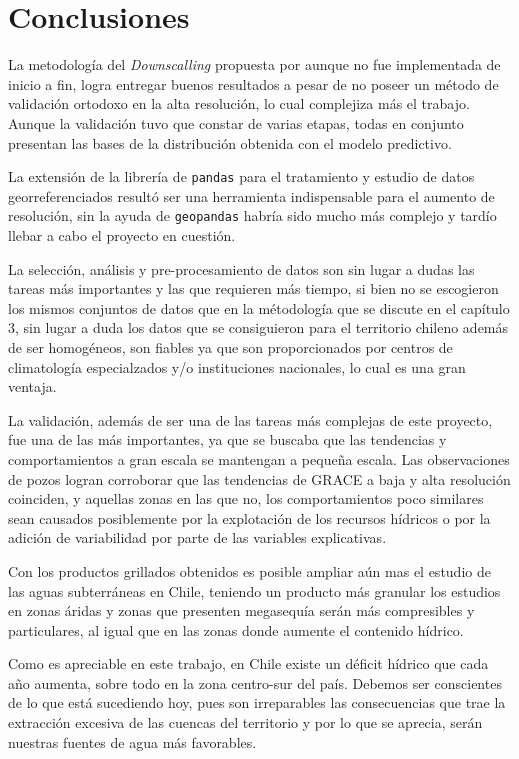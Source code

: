 \chapter{Conclusiones}
\label{C6}

La metodología del \textit{Downscalling} propuesta por \cite{11} aunque no fue implementada de inicio a fin, logra entregar buenos resultados a pesar de no poseer un método de validación ortodoxo en la alta resolución, lo cual
complejiza más el trabajo. Aunque la validación tuvo que constar de varias etapas, todas en conjunto presentan las bases de la distribución obtenida con el modelo predictivo.

La extensión de la librería de \texttt{pandas} para el tratamiento y estudio de datos georreferenciados resultó ser una herramienta indispensable para el aumento de resolución, sin la ayuda de \texttt{geopandas} habría sido
mucho más complejo y tardío llebar a cabo el proyecto en cuestión.

La selección, análisis y pre-procesamiento de datos son sin lugar a dudas las tareas más importantes y las que requieren más tiempo, si bien no se escogieron los mismos conjuntos de datos que en la métodología que se discute 
en el capítulo 3, sin lugar a duda los datos que se consiguieron para el territorio chileno además de ser homogéneos, son fiables ya que son proporcionados por centros de climatología especialzados y/o instituciones nacionales, lo cual
es una gran ventaja.

La validación, además de ser una de las tareas más complejas de este proyecto, fue una de las más importantes, ya que se buscaba que las tendencias y comportamientos a gran escala se mantengan a pequeña escala. Las observaciones de pozos
logran corroborar que las tendencias de GRACE a baja y alta resolución coinciden, y aquellas zonas en las que no, los comportamientos poco similares sean causados posiblemente por la explotación de los recursos hídricos o por la adición de variabilidad por parte de las
variables explicativas.

Con los productos grillados obtenidos es posible ampliar aún mas el estudio de las aguas subterráneas en Chile, teniendo un producto más granular los estudios en zonas áridas y zonas que presenten megasequía serán 
más compresibles y particulares, al igual que en las zonas donde aumente el contenido hídrico.

Como es apreciable en este trabajo, en Chile existe un déficit hídrico que cada año aumenta, sobre todo en la zona centro-sur del país. Debemos ser conscientes de lo que está sucediendo hoy, pues son irreparables las consecuencias que trae
la extracción excesiva de las cuencas del territorio y por lo que se aprecia, serán nuestras fuentes de agua más favorables.